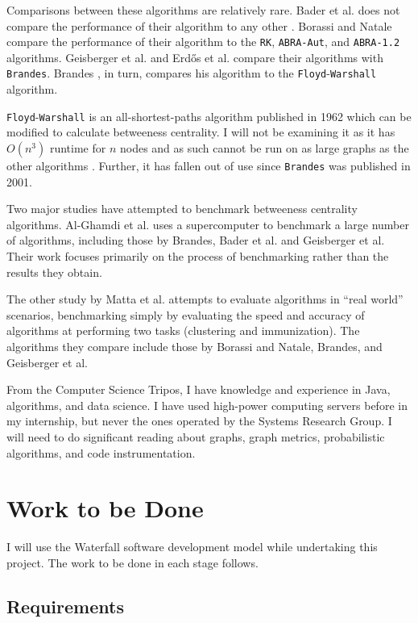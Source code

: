 \documentclass[a4paper,12pt]{article}
\begin{document}
Comparisons between these algorithms are relatively rare. Bader et al. does not compare the performance of their algorithm to any other \cite{bader}. Borassi and Natale \cite{borassi} compare the performance of their algorithm to the \verb|RK|, \verb|ABRA-Aut|, and \verb|ABRA-1.2| algorithms. Geisberger et al. \cite{geisberger} and Erd\H{o}s et al. \cite{erdos} compare their algorithms with \verb|Brandes|. Brandes \cite{brandes}, in turn, compares his algorithm to the \verb|Floyd|-\verb|Warshall| algorithm. 

\verb|Floyd|-\verb|Warshall| \cite{floyd} is an all-shortest-paths algorithm published in 1962 which can be modified to calculate betweeness centrality. I will not be examining it as it has $O(n^3)$ runtime for $n$ nodes and as such cannot be run on as large graphs as the other algorithms \cite{brandes}. Further, it has fallen out of use since \verb|Brandes| was published in 2001.

Two major studies have attempted to benchmark betweeness centrality algorithms. Al-Ghamdi et al. \cite{comparebig} uses a supercomputer to benchmark a large number of algorithms, including those by Brandes, Bader et al. and Geisberger et al. Their work focuses primarily on the process of benchmarking rather than the results they obtain. 

The other study by Matta et al. \cite{comparesmall} attempts to evaluate algorithms in ``real world'' scenarios, benchmarking simply by evaluating the speed and accuracy of algorithms at performing two tasks (clustering and immunization). The algorithms they compare include those by Borassi and Natale, Brandes, and Geisberger et al.

From the Computer Science Tripos, I have knowledge and experience in Java, algorithms, and data science. I have used high-power computing servers before in my internship, but never the ones operated by the Systems Research Group. I will need to do significant reading about graphs, graph metrics, probabilistic algorithms, and code instrumentation.

\section{Work to be Done}

I will use the Waterfall software development model while undertaking this project. The work to be done in each stage follows.

\subsection{Requirements} 
\end{document}
